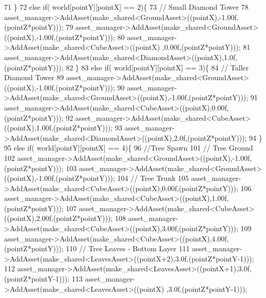 \begin{DoxyCode}
71    \}
72     \textcolor{keywordflow}{else} \textcolor{keywordflow}{if}( world[pointY][pointX] == 2)\{
73             \textcolor{comment}{// Small Diamond Tower}
78 \textcolor{comment}{}            asset\_manager->AddAsset(make\_shared<GroundAsset>((pointX),-1.00f,(pointZ*pointY)));
79             asset\_manager->AddAsset(make\_shared<GroundAsset>((pointX),-1.00f,(pointZ*pointY)));
80             asset\_manager->AddAsset(make\_shared<CubeAsset>((pointX)  ,0.00f,(pointZ*pointY)));
81             asset\_manager->AddAsset(make\_shared<DiamondAsset>((pointX),1.0f,(pointZ*pointY)));
82    \}
83     \textcolor{keywordflow}{else} \textcolor{keywordflow}{if}( world[pointY][pointX] == 3)\{
84             \textcolor{comment}{// Taller Diamond Tower}
89 \textcolor{comment}{}            asset\_manager->AddAsset(make\_shared<GroundAsset>((pointX),-1.00f,(pointZ*pointY)));
90             asset\_manager->AddAsset(make\_shared<GroundAsset>((pointX),-1.00f,(pointZ*pointY)));
91             asset\_manager->AddAsset(make\_shared<CubeAsset>((pointX),0.00f,(pointZ*pointY)));
92             asset\_manager->AddAsset(make\_shared<CubeAsset>((pointX),1.00f,(pointZ*pointY)));
93             asset\_manager->AddAsset(make\_shared<DiamondAsset>((pointX),2.0f,(pointZ*pointY)));
94    \}
95     \textcolor{keywordflow}{else} \textcolor{keywordflow}{if}( world[pointY][pointX] == 4)\{
96             \textcolor{comment}{//Tree Spawn}
101 \textcolor{comment}{}            \textcolor{comment}{// Tree Ground}
102             asset\_manager->AddAsset(make\_shared<GroundAsset>((pointX),-1.00f,(pointZ*pointY)));
103             asset\_manager->AddAsset(make\_shared<GroundAsset>((pointX),-1.00f,(pointZ*pointY)));
104             \textcolor{comment}{// Tree Trunk}
105             asset\_manager->AddAsset(make\_shared<CubeAsset>((pointX),0.00f,(pointZ*pointY)));
106             asset\_manager->AddAsset(make\_shared<CubeAsset>((pointX),1.00f,(pointZ*pointY)));
107             asset\_manager->AddAsset(make\_shared<CubeAsset>((pointX),2.00f,(pointZ*pointY)));
108             asset\_manager->AddAsset(make\_shared<CubeAsset>((pointX),3.00f,(pointZ*pointY)));
109             asset\_manager->AddAsset(make\_shared<CubeAsset>((pointX),4.00f,(pointZ*pointY)));
110             \textcolor{comment}{// Tree Leaves - Bottom Layer}
111             asset\_manager->AddAsset(make\_shared<LeavesAsset>((pointX+2),3.0f,(pointZ*pointY-1)));
112             asset\_manager->AddAsset(make\_shared<LeavesAsset>((pointX+1),3.0f,(pointZ*pointY-1)));
113             asset\_manager->AddAsset(make\_shared<LeavesAsset>((pointX)  ,3.0f,(pointZ*pointY-1)));

\end{DoxyCode}
